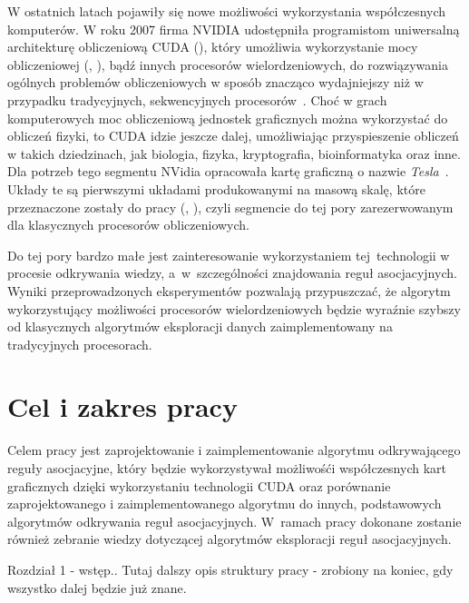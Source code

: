 W ostatnich latach pojawiły się nowe możliwości wykorzystania współczesnych komputerów. W roku 2007 firma NVIDIA udostępniła programistom uniwersalną architekturę obliczeniową CUDA (), który umożliwia wykorzystanie mocy obliczeniowej  (, ), bądź innych procesorów wielordzeniowych, do rozwiązywania ogólnych problemów obliczeniowych w sposób znacząco wydajniejszy niż w przypadku tradycyjnych, sekwencyjnych procesorów~\cite{cuda:zone}. Choć w grach komputerowych moc obliczeniową jednostek graficznych można wykorzystać do obliczeń fizyki, to CUDA idzie jeszcze dalej, umożliwiając przyspieszenie obliczeń w takich dziedzinach, jak biologia, fizyka, kryptografia, bioinformatyka oraz inne. Dla potrzeb tego segmentu NVidia opracowała kartę graficzną o nazwie \emph{Tesla}~\cite{cuda:tesla}. Układy te są pierwszymi układami produkowanymi na masową skalę, które przeznaczone zostały do pracy  (, ), czyli segmencie do tej pory zarezerwowanym dla klasycznych procesorów obliczeniowych.

Do tej pory bardzo małe jest zainteresowanie wykorzystaniem tej~technologii w procesie odkrywania wiedzy, a~w~szczególności znajdowania reguł asocjacyjnych. Wyniki przeprowadzonych eksperymentów pozwalają przypuszczać, że algorytm wykorzystujący możliwości procesorów wielordzeniowych będzie wyraźnie szybszy od klasycznych algorytmów eksploracji danych zaimplementowany na tradycyjnych procesorach.

\section{Cel i zakres pracy}
Celem pracy jest zaprojektowanie i zaimplementowanie algorytmu odkrywającego reguły asocjacyjne, który będzie wykorzystywał możliwośći współczesnych kart graficznych dzięki wykorzystaniu technologii CUDA oraz porównanie zaprojektowanego i zaimplementowanego algorytmu do innych, podstawowych algorytmów odkrywania reguł asocjacyjnych. W~ramach pracy dokonane zostanie również zebranie wiedzy dotyczącej algorytmów eksploracji reguł asocjacyjnych.

Rozdział 1 - wstęp.. Tutaj dalszy opis struktury pracy - zrobiony na koniec, gdy wszystko dalej będzie już znane.